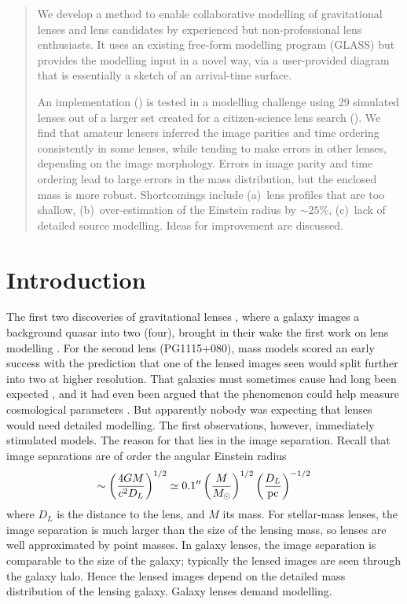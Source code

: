 \begin{abstract}
We develop a method to enable collaborative modelling of gravitational
lenses and lens candidates by experienced but non-professional lens
enthusiasts.  It uses an existing free-form modelling program (GLASS)
but provides the modelling input in a novel way, via a user-provided
diagram that is essentially a sketch of an arrival-time surface. 

An implementation (\spl) is tested in a modelling challenge using 29
simulated lenses out of a larger set created for a citizen-science
lens search (\sw).  We find that amateur lensers inferred the image
parities and time ordering consistently in some lenses, while tending
to make errors in other lenses, depending on the image morphology.
Errors in image parity and time ordering lead to large errors in the
mass distribution, but the enclosed mass is more robust.  Shortcomings
include (a)~lens profiles that are too shallow, (b)~over-estimation of
the Einstein radius by $\sim25\%$, (c)~lack of detailed source
modelling.  Ideas for improvement are discussed.
\end{abstract}

\begin{keywords}
\end{keywords}

\section{Introduction}

The first two discoveries of gravitational lenses
\citep{1979Natur.279..381W,1980Natur.285..641W}, where a galaxy images
a background quasar into two (four), brought in their wake the first
work on lens modelling
\citep{1981ApJ...244..723Y,1981ApJ...244..736Y}.  For the second lens
(PG1115+080), mass models scored an early success with the prediction
that one of the lensed images seen would split further into two at
higher resolution.  That galaxies must sometimes cause had long been
expected \citep{1937ApJ....86..217Z}, and it had even been argued that
the phenomenon could help measure cosmological parameters
\citep{1964MNRAS.128..307R,1966MNRAS.132..101R}.  But apparently
nobody was expecting that lenses would need detailed modelling.
The first observations, however, immediately stimulated models.
The reason for that lies in the image separation. Recall that image
separations are of order the angular Einstein radius
\begin{equation}
\sim \left(\frac{4GM}{c^2 D_L}\right)^{1/2}
\simeq 0.1'' \left(\frac{M}{M_\odot}\right)^{1/2}
             \left(\frac{D_L}{\rm pc}\right)^{-1/2}
\end{equation}
where $D_L$ is the distance to the lens, and $M$ its mass.  For
stellar-mass lenses, the image separation is much larger than the size
of the lensing mass, so lenses are well approximated by point masses.
In galaxy lenses, the image separation is comparable to the size of
the galaxy; typically the lensed images are seen through the galaxy
halo.  Hence the lensed images depend on the detailed mass
distribution of the lensing galaxy.  Galaxy lenses demand modelling.

